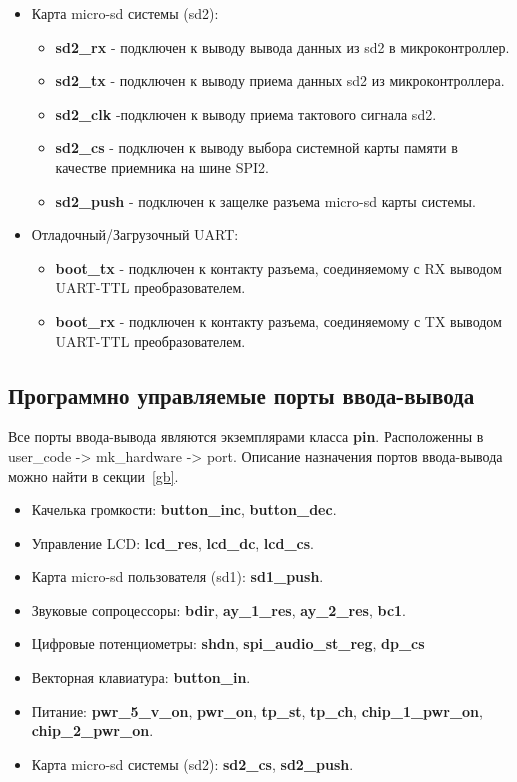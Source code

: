 \documentclass[a4paper, 12pt]{article}
\begin{document}
\begin{itemize}
	\item Карта micro-sd системы (sd2):
	\begin{itemize}
		\item \textbf{sd2\_rx} - подключен к выводу вывода данных из sd2 в микроконтроллер.
		\item \textbf{sd2\_tx} - подключен к выводу приема данных sd2 из микроконтроллера.
		\item \textbf{sd2\_clk} -подключен к выводу приема тактового сигнала sd2.
		\item \textbf{sd2\_cs} - подключен к выводу выбора системной карты памяти в качестве приемника на шине SPI2.
		\item \textbf{sd2\_push} - подключен к защелке разъема micro-sd карты системы.
	\end{itemize}
	
	\item Отладочный/Загрузочный UART:
	\begin{itemize}
		\item \textbf{boot\_tx} - подключен к контакту разъема, соединяемому с RX выводом UART-TTL преобразователем.
		\item \textbf{boot\_rx} - подключен к контакту разъема, соединяемому с TX выводом UART-TTL преобразователем.
	\end{itemize}
\end{itemize}

\subsection{Программно управляемые порты ввода-вывода}
Все порты ввода-вывода являются экземплярами класса \textbf{pin}. Расположенны в user\_code -> mk\_hardware -> port. Описание назначения портов ввода-вывода можно найти в секции~\ref{gb}.
\begin{itemize}
	\item Качелька громкости: \textbf{button\_inc}, \textbf{button\_dec}.
	\item Управление LCD: \textbf{lcd\_res}, \textbf{lcd\_dc}, \textbf{lcd\_cs}.
	\item Карта micro-sd пользователя (sd1): \textbf{sd1\_push}.
	\item Звуковые сопроцессоры: \textbf{bdir}, \textbf{ay\_1\_res}, \textbf{ay\_2\_res}, \textbf{bc1}.
	\item Цифровые потенциометры: \textbf{shdn}, \textbf{spi\_audio\_st\_reg}, \textbf{dp\_cs}
	\item Векторная клавиатура: \textbf{button\_in}.
	\item Питание: \textbf{pwr\_5\_v\_on}, \textbf{pwr\_on}, \textbf{tp\_st}, \textbf{tp\_ch}, \textbf{chip\_1\_pwr\_on}, \textbf{chip\_2\_pwr\_on}.
	\item Карта micro-sd системы (sd2): \textbf{sd2\_cs}, \textbf{sd2\_push}.
\end{itemize}
\end{document}
